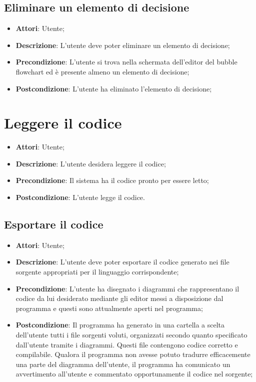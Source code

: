\documentclass[../AnalisiDeiRequisiti.tex]{subfiles}
\begin{document}
	\subsection{Eliminare un elemento di decisione}
	\begin{itemize}
		\item \textbf{Attori}: Utente;
		\item \textbf{Descrizione}: L'utente deve poter eliminare un elemento di decisione;
		\item \textbf{Precondizione}: L'utente si trova nella schermata dell'editor del bubble flowchart ed è presente almeno un elemento di decisione;
		\item \textbf{Postcondizione}: L'utente ha eliminato l'elemento di decisione;
	\end{itemize}
	
	
	\section{Leggere il codice}
	\begin{itemize}
		\item \textbf{Attori}: Utente;
		\item \textbf{Descrizione}: L'utente desidera leggere il codice;
		\item \textbf{Precondizione}: Il sistema ha il codice pronto per essere letto;
		\item \textbf{Postcondizione}: L'utente legge il codice. 
	\end{itemize}
	
	\subsection{Esportare il codice}
	\begin{itemize}
		\item \textbf{Attori}: Utente;
		\item \textbf{Descrizione}: L'utente deve poter esportare il codice generato nei file sorgente appropriati per il linguaggio corrispondente;
		\item \textbf{Precondizione}: L'utente ha disegnato i diagrammi che rappresentano il codice da lui desiderato mediante gli editor messi a disposizione dal programma e questi sono attualmente aperti nel programma;
		\item \textbf{Postcondizione}: Il programma ha generato in una cartella a scelta dell'utente tutti i file sorgenti voluti, organizzati secondo quanto specificato dall'utente tramite i diagrammi. Questi file contengono codice corretto e compilabile. Qualora il programma non avesse potuto tradurre efficacemente una parte del diagramma dell'utente, il programma ha comunicato un avvertimento all'utente e commentato opportunamente il codice nel sorgente;
	\end{itemize}
	
\end{document}
